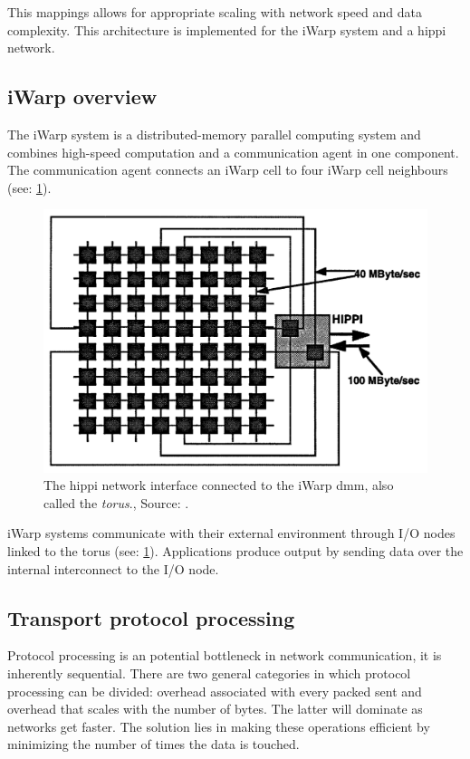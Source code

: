 This mappings allows for appropriate scaling with network speed and data complexity.
This architecture is implemented for the iWarp system and a \ac{hippi} network.

\subsection{iWarp overview}
The iWarp system is a distributed-memory parallel computing system and combines high-speed computation and a communication agent in one component.
The communication agent connects an iWarp cell to four iWarp cell neighbours (see: \cref{fig:rep4:torus}).

\begin{figure}
    \centering
	\includegraphics[width=0.95\linewidth]{Figures/Rep4torus.png}
	\caption{The \ac{hippi} network interface connected to the iWarp \ac{dmm}, also called the \textit{torus}., Source: \cite{steenkiste1997high}.} 
    \label{fig:rep4:torus}
\end{figure}

iWarp systems communicate with their external environment through I/O nodes linked to the torus (see: \cref{fig:rep4:torus}).
Applications produce output by sending data over the internal interconnect to the I/O node.

\subsection{Transport protocol processing}
Protocol processing is an potential bottleneck in network communication, it is inherently sequential.
There are two general categories in which protocol processing can be divided: overhead associated with every packed sent and overhead that scales with the number of bytes.
The latter will dominate as networks get faster.
The solution lies in making these operations efficient by minimizing the number of times the data is touched.


